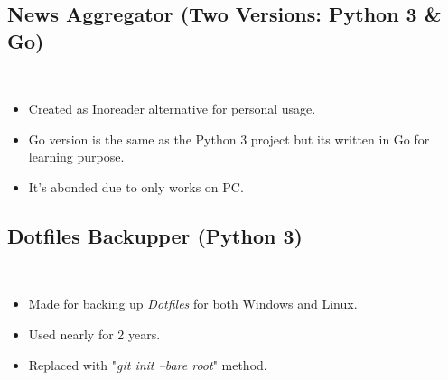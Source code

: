 {	\subsection{News Aggregator (Two Versions: Python 3 \& Go)} \hfill \\
	\begin{itemize}
		\item Created as Inoreader alternative for personal usage.
		\item Go version is the same as the Python 3 project but its written in Go
		for learning purpose.
		\item It's abonded due to only works on PC.
	\end{itemize}


	\subsection{Dotfiles Backupper (Python 3)} \hfill \\
	\begin{itemize}
		\item Made for backing up \emph{Dotfiles} for both Windows and Linux.
		\item Used nearly for 2 years.
		\item Replaced with "\emph{git init --bare root}" method.
	\end{itemize}
}

